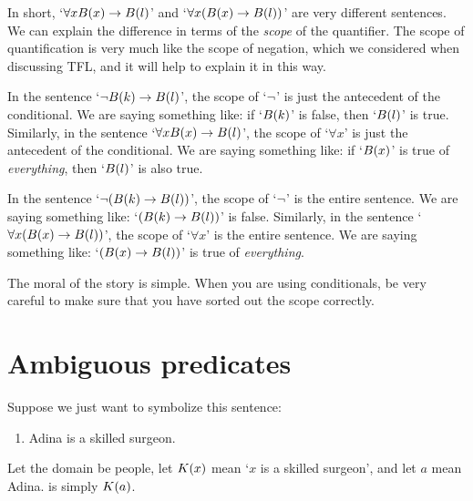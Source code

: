 In short, `$\forall x B(x) \rightarrow B(l)$' and `$\forall x (B(x) \rightarrow B(l))$' are very different sentences. We can explain the difference in terms of the \emph{scope} of the quantifier. The scope of quantification is very much like the scope of negation, which we considered when discussing TFL, and it will help to explain it in this way.

In the sentence `$\neg B(k) \rightarrow B(l)$', the scope of `$\neg$' is just the antecedent of the conditional. We are saying something like: if `$B(k)$' is false, then `$B(l)$' is true. Similarly, in the sentence `$\forall x B(x) \rightarrow B(l)$', the scope of `$\forall x$' is just the antecedent of the conditional. We are saying something like: if `$B(x)$' is true of \emph{everything}, then `$B(l)$' is also true.

In the sentence `$\neg(B(k) \rightarrow B(l))$', the scope of `$\neg$' is the entire sentence. We are saying something like: `$(B(k) \rightarrow B(l))$' is false. Similarly, in the sentence `$\forall x (B(x) \rightarrow B(l))$', the scope of `$\forall x$' is the entire sentence. We are saying something like: `$(B(x) \rightarrow B(l))$' is true of \emph{everything}.

The moral of the story is simple. When you are using conditionals, be very careful to make sure that you have sorted out the scope correctly.

\section{Ambiguous predicates}

Suppose we just want to symbolize this sentence:
\begin{enumerate}
\item\label{surgeon1} Adina is a skilled surgeon.
\end{enumerate}
Let the domain be people, let $K(x)$ mean `$x$ is a skilled surgeon', and let $a$ mean Adina.  is simply $K(a)$.


